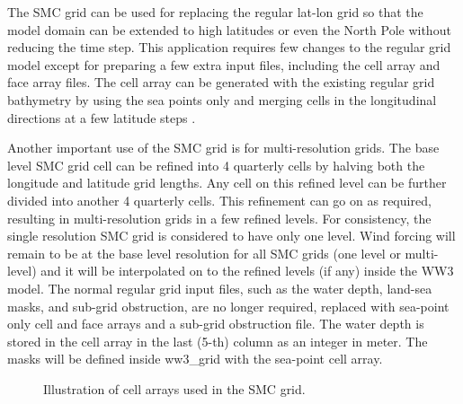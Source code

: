 The SMC grid can be used for replacing the regular lat-lon grid so that the
model domain can be extended to high latitudes or even the North Pole without
reducing the time step. This application requires few changes to the
regular grid model except for preparing a few extra input files, including the
cell array and face array files. The cell array can be generated with the
existing regular grid bathymetry by using the sea points only and merging
cells in the longitudinal directions at a few latitude steps \citep{art:Li11}.

Another important use of the SMC grid is for multi-resolution grids.
The base level SMC grid cell can be refined into 4 quarterly cells
by halving both the longitude and latitude grid lengths. Any cell
on this refined level can be further divided into another 4 quarterly
cells. This refinement can go on as required, resulting in multi-resolution
grids in a few refined levels. For consistency, the single resolution
SMC grid is considered to have only one level. Wind forcing will remain
to be at the base level resolution for all SMC grids (one level or
multi-level) and it will be interpolated on to the refined levels
(if any) inside the WW3 model. The normal regular grid input files,
such as the water depth, land-sea masks, and sub-grid obstruction,
are no longer required, replaced with sea-point only cell and face arrays
and a sub-grid obstruction file.  The water depth is stored in the cell array 
in the last (5-th) column as an integer in meter.  The masks will be defined  
inside ww3\_grid with the sea-point cell array.

\begin{figure}
\centerline{}
\caption{Illustration of cell arrays used in the SMC grid.}
\label{fig:SMCells} \botline
\end{figure}

